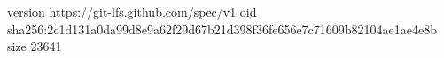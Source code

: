 version https://git-lfs.github.com/spec/v1
oid sha256:2c1d131a0da99d8e9a62f29d67b21d398f36fe656e7c71609b82104ae1ae4e8b
size 23641
